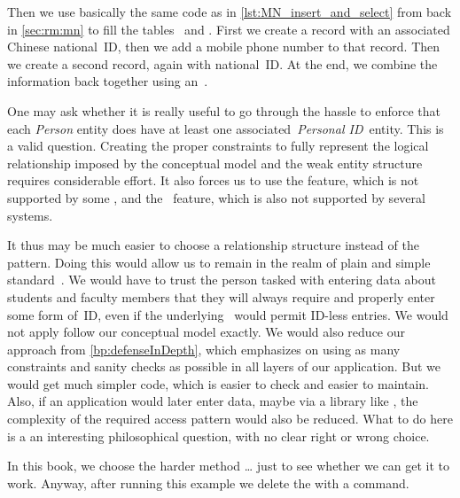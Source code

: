 Then we use basically the same code as in \cref{lst:MN_insert_and_select} from back in \cref{sec:rm:mn} to fill the tables~ and .
First we create a  record with an associated Chinese national~ID, then we add a mobile phone number to that record.
Then we create a second record, again with national~ID.
At the end, we combine the information back together using an~.

One may ask whether it is really useful to go through the hassle to enforce that each \emph{Person} entity does have at least one associated~\emph{Personal ID}~entity.
This is a valid question.
Creating the proper constraints to fully represent the logical relationship imposed by the conceptual model and the weak entity structure requires considerable effort.
It also forces us to use the  feature, which is not supported by some , and the ~feature, which is also not supported by several systems.

It thus may be much easier to choose a  relationship structure instead of the  pattern.
Doing this would allow us to remain in the realm of plain and simple standard~\sql.
We would have to trust the person tasked with entering data about students and faculty members that they will always require and properly enter some form of~ID, even if the underlying \db\ would permit ID\nobreakdashes-less entries.
We would not apply follow our conceptual model exactly.
We would also reduce our  approach from \cref{bp:defenseInDepth}, which emphasizes on using as many constraints and sanity checks as possible in all layers of our application.
But we would get much simpler code, which is easier to check and easier to maintain.
Also, if an application would later enter data, maybe via a library like \psycopg, the complexity of the required access pattern would also be reduced.
What to do here is a an interesting philosophical question, with no clear right or wrong choice.

In this book, we choose the harder method {\dots} just to see whether we can get it to work.
Anyway, after running this example we delete the  with a  command.
%
\FloatBarrier%
\endhsection%
%
